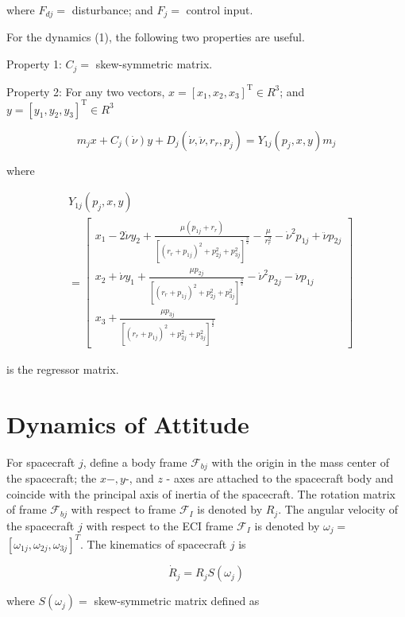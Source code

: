 \documentclass[10pt]{article}
\begin{document}
where $F_{d j}=$ disturbance; and $F_{j}=$ control input.

For the dynamics (1), the following two properties are useful.

Property 1: $C_{j}=$ skew-symmetric matrix.

Property 2: For any two vectors, $x=\left[x_{1}, x_{2}, x_{3}\right]^{\mathrm{T}} \in R^{3}$; and $y=\left[y_{1}, y_{2}, y_{3}\right]^{\mathrm{T}} \in R^{3}$

$$
m_{j} x+C_{j}(\dot{\nu}) y+D_{j}\left(\dot{\nu}, \ddot{\nu}, r_{r}, p_{j}\right)=Y_{1 j}\left(p_{j}, x, y\right) m_{j}
$$

where

$$
\begin{aligned}
& Y_{1 j}\left(p_{j}, x, y\right) \\
& =\left[\begin{array}{c}
x_{1}-2 \dot{\nu} y_{2}+\frac{\mu\left(p_{1 j}+r_{r}\right)}{\left[\left(r_{r}+p_{1 j}\right)^{2}+p_{2 j}^{2}+p_{3 j}^{2}\right]^{\frac{3}{2}}}-\frac{\mu}{r_{r}^{2}}-\dot{\nu}^{2} p_{1 j}+\ddot{\nu} p_{2 j} \\
x_{2}+\dot{\nu} y_{1}+\frac{\mu p_{2 j}}{\left[\left(r_{r}+p_{1 j}\right)^{2}+p_{2 j}^{2}+p_{3 j}^{2}\right]^{\frac{3}{2}}}-\dot{\nu}^{2} p_{2 j}-\ddot{\nu} p_{1 j} \\
x_{3}+\frac{\mu p_{3 j}}{\left[\left(r_{r}+p_{1 j}\right)^{2}+p_{2 j}^{2}+p_{3 j}^{2}\right]^{\frac{3}{2}}}
\end{array}\right]
\end{aligned}
$$

is the regressor matrix.

\section{Dynamics of Attitude}
For spacecraft $j$, define a body frame $\mathcal{F}_{b j}$ with the origin in the mass center of the spacecraft; the $x-, y$-, and $z$ - axes are attached to the spacecraft body and coincide with the principal axis of inertia of the spacecraft. The rotation matrix of frame $\mathcal{F}_{b j}$ with respect to frame $\mathcal{F}_{I}$ is denoted by $R_{j}$. The angular velocity of the spacecraft $j$ with respect to the ECI frame $\mathcal{F}_{I}$ is denoted by $\omega_{j}=$ $\left[\omega_{1 j}, \omega_{2 j}, \omega_{3 j}\right]^{T}$. The kinematics of spacecraft $j$ is

$$
\dot{R}_{j}=R_{j} S\left(\omega_{j}\right)
$$

where $S\left(\omega_{j}\right)=$ skew-symmetric matrix defined as
\end{document}
